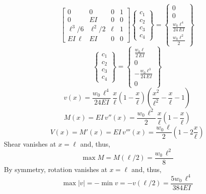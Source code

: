 \documentclass[11pt, oneside]{article}   	%
\newcommand{\DS}{\displaystyle}
\begin{document}
\begin{equation}
   \left[ 
   \begin{array}{cccc}
    0 & 0 & 0 & 1 \\
    0 & EI & 0 & 0 \\
    \ell^3/6 & \ell^2/2 & \ell & 1 \\
    EI\,\ell & EI & 0 & 0 
   \end{array}
   \right]
   \left\{ 
   \begin{array}{c}
    c_1 \\
    c_2 \\
    c_3 \\
    c_4 
   \end{array}
   \right\}
   =
   \left\{ 
   \begin{array}{c}
    0 \\
    0 \\
    \DS\frac{w_0 \ell^4}{24\, EI} \\[2ex]
    \DS\frac{w_0 \ell^2}{2}
   \end{array}
   \right\}
   \label{A9}
\end{equation}
\begin{equation}
   \left\{ 
   \begin{array}{c}
    c_1 \\
    c_2 \\
    c_3 \\
    c_4 
   \end{array}
   \right\}
   =
   \left\{ 
   \begin{array}{c}
    \DS\frac{w_0 \ell}{2\, EI} \\[2ex]
    0 \\
    \DS-\frac{w_0 \ell^3}{24\, EI} \\[2ex]
    0
   \end{array}
   \right\}
   \label{A10}
\end{equation}
\begin{equation}
   v(x) 
   =  \frac{w_0\,\ell^4}{24 EI} \, \frac{x}{\ell} \left( 1 -\frac{x}{\ell}  \right)\left( \frac{x^2}{\ell^2} -\frac{x}{\ell}  - 1 \right)
   \label{A11}
\end{equation}
\begin{equation}
   M(x) = EI\,v''(x) = \frac{w_0\,\ell^2}{2} \,\frac{x}{\ell} \left( 1 -\frac{x}{\ell}  \right)
   \label{A12}
\end{equation}
\begin{equation}
   V(x) = M'(x) = EI\,v'''(x) = \frac{w_0\,\ell}{2} \left( 1 - 2\frac{x}{\ell}  \right)
   \label{A13}
\end{equation}
Shear vanishes at $x=\ell$ and, thus,
\begin{equation}
   \max M = M(\ell/2) = \frac{w_0\,\ell^2}{8} 
   \label{A14}
\end{equation}
By symmetry, rotation vanishes at $x=\ell$ and, thus,
\begin{equation}
   \max |v| = -\min v = -v(\ell/2) = \frac{5 w_0\,\ell^4}{384 EI}
   \label{A15}
\end{equation}
\end{document}
